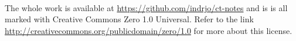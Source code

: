 

\newpage

~\vfill

\noindent The whole work is available at \url{https://github.com/indrjo/ct-notes} and is is all marked with {\sc Creative Commons Zero 1.0 Universal}. Refer to the link \url{http://creativecommons.org/publicdomain/zero/1.0} for more about this license.

\cleardoublepage
